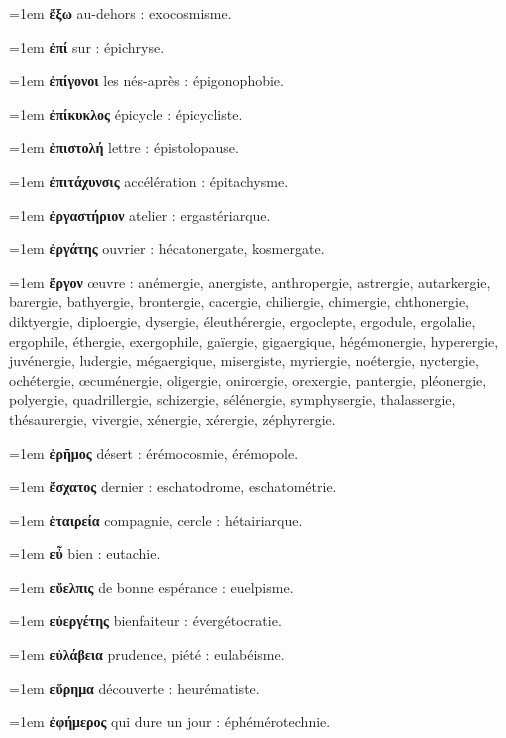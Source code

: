 \hangindent=1em \textbf{ἔξω} au-dehors : exocosmisme.\par
\hangindent=1em \textbf{ἐπί} sur : épichryse.\par
\hangindent=1em \textbf{ἐπίγονοι} les nés-après : épigonophobie.\par
\hangindent=1em \textbf{ἐπίκυκλος} épicycle : épicycliste.\par
\hangindent=1em \textbf{ἐπιστολή} lettre : épistolopause.\par
\hangindent=1em \textbf{ἐπιτάχυνσις} accélération : épitachysme.\par
\hangindent=1em \textbf{ἐργαστήριον} atelier : ergastériarque.\par
\hangindent=1em \textbf{ἐργάτης} ouvrier : hécatonergate, kosmergate.\par
\hangindent=1em \textbf{ἔργον} œuvre : anémergie, anergiste, anthropergie, astrergie, autarkergie, barergie, bathyergie, brontergie, cacergie, chiliergie, chimergie, chthonergie, diktyergie, diploergie, dysergie, éleuthérergie, ergoclepte, ergodule, ergolalie, ergophile, éthergie, exergophile, gaïergie, gigaergique, hégémonergie, hyperergie, juvénergie, ludergie, mégaergique, misergiste, myriergie, noétergie, nyctergie, ochétergie, œcuménergie, oligergie, onirœrgie, orexergie, pantergie, pléonergie, polyergie, quadrillergie, schizergie, sélénergie, symphysergie, thalassergie, thésaurergie, vivergie, xénergie, xérergie, zéphyrergie.\par
\hangindent=1em \textbf{ἐρῆμος} désert : érémocosmie, érémopole.\par
\hangindent=1em \textbf{ἔσχατος} dernier : eschatodrome, eschatométrie.\par
\hangindent=1em \textbf{ἑταιρεία} compagnie, cercle : hétairiarque.\par
\hangindent=1em \textbf{εὖ} bien : eutachie.\par
\hangindent=1em \textbf{εὔελπις} de bonne espérance : euelpisme.\par
\hangindent=1em \textbf{εὐεργέτης} bienfaiteur : évergétocratie.\par
\hangindent=1em \textbf{εὐλάβεια} prudence, piété : eulabéisme.\par
\hangindent=1em \textbf{εὕρημα} découverte : heurématiste.\par
\hangindent=1em \textbf{ἐφήμερος} qui dure un jour : éphémérotechnie.\par
